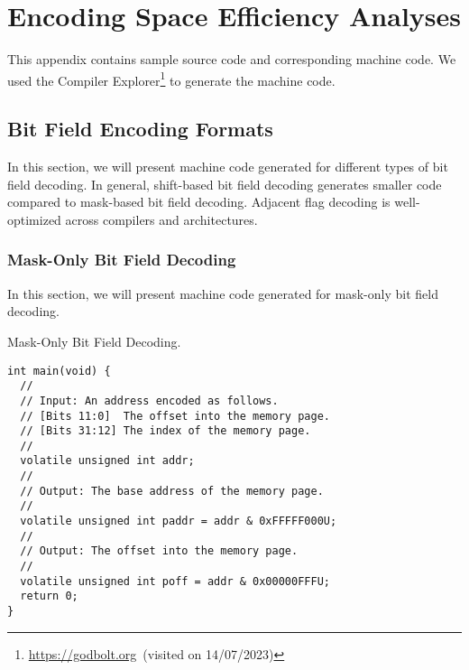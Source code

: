 \appendix

\FloatBarrier
\chapter{Encoding Space Efficiency Analyses}

This appendix contains sample source code and corresponding machine code. We used the Compiler Explorer\footnote{\url{https://godbolt.org}~(visited on 14/07/2023)} to generate the machine code.

\FloatBarrier
\section{Bit Field Encoding Formats}
\label{sec:enc_formats}

In this section, we will present machine code generated for different types of bit field decoding. In general, shift-based bit field decoding generates smaller code compared to mask-based bit field decoding. Adjacent flag decoding is well-optimized across compilers and architectures.

\FloatBarrier
\subsection{Mask-Only Bit Field Decoding}
\label{sec:mask_dec}

In this section, we will present machine code generated for mask-only bit field decoding.

\begin{lstfloat}[!htb]
  \centering
  \caption{Mask-Only Bit Field Decoding.}
  \label{lst:mask_dec}
  \begin{lstlisting}[style=c]
int main(void) {
  //
  // Input: An address encoded as follows.
  // [Bits 11:0]  The offset into the memory page.
  // [Bits 31:12] The index of the memory page.
  //
  volatile unsigned int addr;
  //
  // Output: The base address of the memory page.
  //
  volatile unsigned int paddr = addr & 0xFFFFF000U;
  //
  // Output: The offset into the memory page.
  //
  volatile unsigned int poff = addr & 0x00000FFFU;
  return 0;
}
  \end{lstlisting}
\end{lstfloat}

